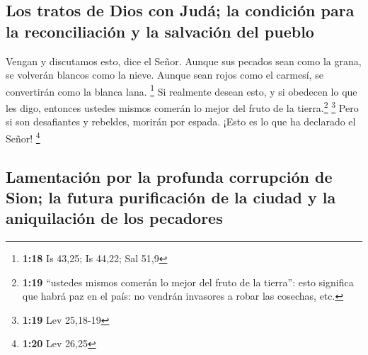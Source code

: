 \hypertarget{los-tratos-de-dios-con-juduxe1-la-condiciuxf3n-para-la-reconciliaciuxf3n-y-la-salvaciuxf3n-del-pueblo}{%
\subsection{Los tratos de Dios con Judá; la condición para la
reconciliación y la salvación del
pueblo}\label{los-tratos-de-dios-con-juduxe1-la-condiciuxf3n-para-la-reconciliaciuxf3n-y-la-salvaciuxf3n-del-pueblo}}

 Vengan y discutamos esto, dice el Señor. Aunque sus
pecados sean como la grana, se volverán blancos como la nieve. Aunque
sean rojos como el carmesí, se convertirán como la blanca lana.
\footnote{\textbf{1:18} Is 43,25; Is 44,22; Sal 51,9}  Si
realmente desean esto, y si obedecen lo que les digo, entonces ustedes
mismos comerán lo mejor del fruto de la tierra.\footnote{\textbf{1:19}
  ``ustedes mismos comerán lo mejor del fruto de la tierra'': esto
  significa que habrá paz en el país: no vendrán invasores a robar las
  cosechas, etc.} \footnote{\textbf{1:19} Lev 25,18-19} 
Pero si son desafiantes y rebeldes, morirán por espada. ¡Esto es lo que
ha declarado el Señor! \footnote{\textbf{1:20} Lev 26,25}

\hypertarget{lamentaciuxf3n-por-la-profunda-corrupciuxf3n-de-sion-la-futura-purificaciuxf3n-de-la-ciudad-y-la-aniquilaciuxf3n-de-los-pecadores}{%
\subsection{Lamentación por la profunda corrupción de Sion; la futura
purificación de la ciudad y la aniquilación de los
pecadores}\label{lamentaciuxf3n-por-la-profunda-corrupciuxf3n-de-sion-la-futura-purificaciuxf3n-de-la-ciudad-y-la-aniquilaciuxf3n-de-los-pecadores}}


